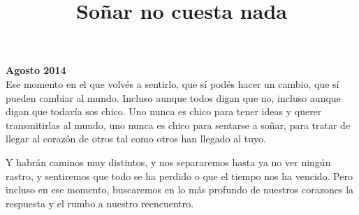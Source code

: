 \documentclass[12t, a4 paper]{article}
\title{Soñar no cuesta nada }
\date{}
\begin{document}
\maketitle

\textbf{Agosto 2014} \\

Ese momento en el que volvés a sentirlo, que sí podés hacer un cambio, que sí pueden cambiar al mundo. Incluso aunque todos digan que no, incluso aunque digan que todavía sos chico. Uno nunca es chico para tener ideas y querer transmitirlas al mundo, uno nunca es chico para sentarse a soñar, para tratar de llegar al corazón de otros tal como otros han llegado al tuyo. 

 

Y habrán caminos muy distintos, y nos separaremos hasta ya no ver ningún rastro, y sentiremos que todo se ha perdido o que el tiempo nos ha vencido. Pero incluso en ese momento, buscaremos en lo más profundo de nuestros corazones la respuesta y el rumbo a nuestro reencuentro. 
\end{document}
